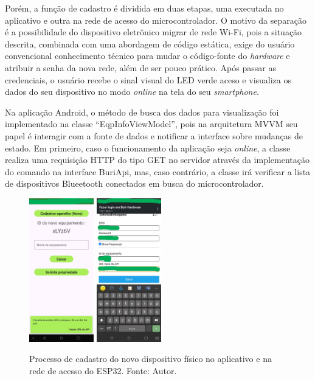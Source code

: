 Porém, a função de cadastro é dividida em duas etapas, uma executada no aplicativo e outra na rede de acesso do microcontrolador. O motivo da separação 
é a possibilidade do dispositivo eletrônico migrar de rede Wi-Fi, pois a situação descrita, combinada com uma abordagem de código estática, exige do usuário convencional conhecimento técnico para mudar o código-fonte do \textit{hardware} e 
atribuir a senha da nova rede, além de ser pouco prático. Após passar as credenciais, o usuário recebe o sinal visual do LED verde aceso e visualiza os dados do seu dispositivo no modo \textit{online} na tela do seu \textit{smartphone}.

Na aplicação Android, o método de busca dos dados para visualização foi implementado na classe ``EqpInfoViewModel'', pois na arquitetura MVVM seu papel é interagir com a fonte de dados e notificar a interface sobre mudanças de estado. Em primeiro, caso 
o funcionamento da aplicação seja \textit{online}, a classe realiza uma requisição HTTP do tipo GET no servidor através da implementação do comando na interface BuriApi, mas, caso contrário, a classe irá verificar a lista de dispositivos Blueetooth conectados em busca do 
microcontrolador.

\begin{figure}[ht]
    \centering
    \includegraphics[width=0.25\textwidth]{img/buri-config-software.jpg}
    \includegraphics[width=0.25\textwidth]{img/buri-config-hardware.jpg}
    \caption{Processo de cadastro do novo dispositivo físico no aplicativo e na rede de acesso do ESP32. Fonte: Autor.}\label{figBuriConfig}
\end{figure}


